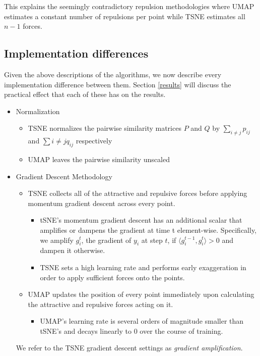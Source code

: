 \documentclass[sigconf, nonacm]{acmart}
\begin{document}
This explains the seemingly contradictory repulsion methodologies where UMAP estimates a constant number of repulsions per point while TSNE estimates
all $n-1$ forces.

\subsection{Implementation differences} \label{implementation_diffs}
Given the above descriptions of the algorithms, we now describe every implementation difference between them. Section \ref{results} will discuss the
practical effect that each of these has on the results.

\begin{itemize}
    \item Normalization
        \begin{itemize}
            \item TSNE normalizes the pairwise similarity matrices $P$ and $Q$ by $\sum_{i \neq j} p_{ij}$ and $\sum{i \neq j} q_{ij}$ respectively
            \item UMAP leaves the pairwise similarity unscaled
        \end{itemize}

    \item Gradient Descent Methodology
        \begin{itemize}
        \item TSNE collects all of the attractive and repulsive forces before applying momentum gradient descent across every point.
            \begin{itemize}
                \item tSNE's momentum gradient descent has an additional scalar that amplifies or dampens the gradient at time t element-wise. Specifically, we
                    amplify $g_i^t$, the gradient of $y_i$ at step $t$, if $\langle g_i^{t-1}, g_i^t \rangle > 0$ and dampen it otherwise.
                \item TSNE sets a high learning rate and performs early exaggeration \cite{van2008visualizing} in order to apply sufficient forces onto the points.
            \end{itemize}
        \item UMAP updates the position of every point immediately upon calculating the attractive and repulsive forces acting on it.
            \begin{itemize}
                \item UMAP's learning rate is several orders of magnitude smaller than tSNE's and decays linearly to 0 over the course of training.
            \end{itemize}
        \end{itemize}
        We refer to the TSNE gradient descent settings as \textit{gradient amplification}.


\end{itemize}
\end{document}
